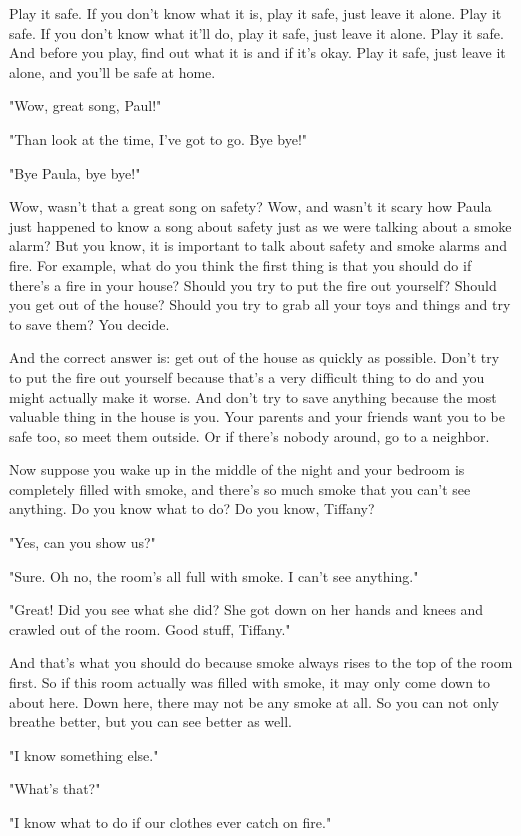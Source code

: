 Play it safe. If you don't know what it is, play it safe, just leave it alone. Play it safe. If you don't know what it'll do, play it safe, just leave it alone. Play it safe. And before you play, find out what it is and if it's okay. Play it safe, just leave it alone, and you'll be safe at home.

"Wow, great song, Paul!"

"Than look at the time, I've got to go. Bye bye!"

"Bye Paula, bye bye!"

Wow, wasn't that a great song on safety? Wow, and wasn't it scary how Paula just happened to know a song about safety just as we were talking about a smoke alarm? But you know, it is important to talk about safety and smoke alarms and fire. For example, what do you think the first thing is that you should do if there's a fire in your house? Should you try to put the fire out yourself? Should you get out of the house? Should you try to grab all your toys and things and try to save them? You decide.

And the correct answer is: get out of the house as quickly as possible. Don't try to put the fire out yourself because that's a very difficult thing to do and you might actually make it worse. And don't try to save anything because the most valuable thing in the house is you. Your parents and your friends want you to be safe too, so meet them outside. Or if there's nobody around, go to a neighbor.

Now suppose you wake up in the middle of the night and your bedroom is completely filled with smoke, and there's so much smoke that you can't see anything. Do you know what to do? Do you know, Tiffany?

"Yes, can you show us?"

"Sure. Oh no, the room's all full with smoke. I can't see anything."

"Great! Did you see what she did? She got down on her hands and knees and crawled out of the room. Good stuff, Tiffany."

And that's what you should do because smoke always rises to the top of the room first. So if this room actually was filled with smoke, it may only come down to about here. Down here, there may not be any smoke at all. So you can not only breathe better, but you can see better as well.

"I know something else."

"What's that?"

"I know what to do if our clothes ever catch on fire."

